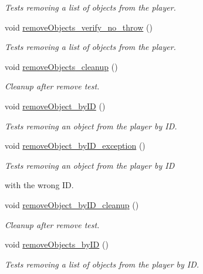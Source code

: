 \begin{DoxyCompactItemize}
\begin{DoxyCompactList}\small\item\em Tests removing a list of objects from the player. \end{DoxyCompactList}\item 
void \hyperlink{classdefault__player_ae749a7881ab40de5bc08c7755beedbc8}{remove\-Objects\-\_\-verify\-\_\-no\-\_\-throw} ()
\begin{DoxyCompactList}\small\item\em Tests removing a list of objects from the player. \end{DoxyCompactList}\item 
void \hyperlink{classdefault__player_afe7db1612cd2af32f26d83a8121bd14c}{remove\-Objects\-\_\-cleanup} ()
\begin{DoxyCompactList}\small\item\em Cleanup after remove test. \end{DoxyCompactList}\item 
void \hyperlink{classdefault__player_af9d8e512b5bf580680a69271e5748afa}{remove\-Object\-\_\-by\-I\-D} ()
\begin{DoxyCompactList}\small\item\em Tests removing an object from the player by I\-D. \end{DoxyCompactList}\item 
void \hyperlink{classdefault__player_afa11b1b1d4fcd5b1e9021b7c4a31cd2c}{remove\-Object\-\_\-by\-I\-D\-\_\-exception} ()
\begin{DoxyCompactList}\small\item\em Tests removing an object from the player by I\-D \par
with the wrong I\-D. \end{DoxyCompactList}\item 
void \hyperlink{classdefault__player_a9b98fbd3caba12fba28349e2495873cc}{remove\-Object\-\_\-by\-I\-D\-\_\-cleanup} ()
\begin{DoxyCompactList}\small\item\em Cleanup after remove test. \end{DoxyCompactList}\item 
void \hyperlink{classdefault__player_a93c22422db2b8fce5164c28fc44f342d}{remove\-Objects\-\_\-by\-I\-D} ()
\begin{DoxyCompactList}\small\item\em Tests removing a list of objects from the player by I\-D. \end{DoxyCompactList}\item 

\end{DoxyCompactItemize}

